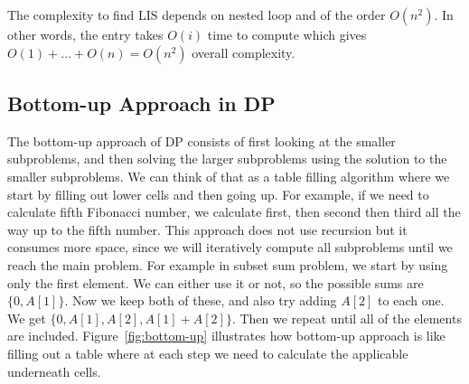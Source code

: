 \documentclass[11pt]{article}
\theoremstyle{definition}
\begin{document}
The complexity to find LIS depends on nested loop and of the order $O(n^2)$. In other words, the entry  takes $O(i)$ time to compute which gives $O(1)+\ldots+O(n)= O(n^2)$ overall complexity.

\subsection{Bottom-up Approach in DP}
The bottom-up approach of DP consists of first looking at the smaller subproblems, and then solving the larger subproblems using the solution to the smaller subproblems. We can think of that as a table filling algorithm where we start by filling out lower cells and then going up. For example, if we need to calculate fifth Fibonacci number, we calculate first, then second then third all the way up to the fifth number. This approach does not use recursion but it consumes more space, since we will iteratively compute all subproblems until we reach the main problem. For example in subset sum problem,  we start by using only the first element. We can either use it or not, so the possible sums are $\{0, A[1]\}$. Now we keep both of these, and also try adding $A[2]$ to each one. We get $\{0, A[1], A[2], A[1]+A[2]\}$. Then we repeat until all of the elements are included. Figure~\ref{fig:bottom-up} illustrates how bottom-up approach is like filling out a table where at each step we need to calculate the applicable underneath cells.
\end{document}
